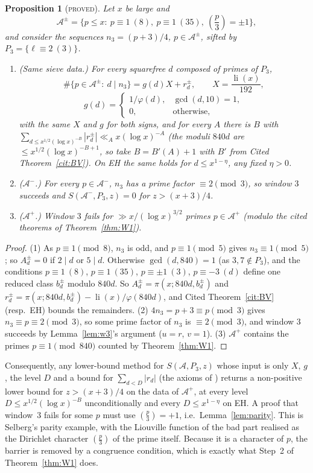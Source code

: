 \documentclass[11pt,reqno]{amsart}
\newtheorem{proposition}[theorem]{Proposition}
\theoremstyle{definition}
\newcommand{\li}{\operatorname{li}}
\newcommand{\leg}[2]{\left(\frac{#1}{#2}\right)}
\newcommand{\status}[1]{\textup{\textsc{#1}}}
\begin{document}
\begin{proposition}[\status{proved}]\label{thm:P1}
Let $x$ be large and
\[
 \mathcal A^\pm=\{p\le x:\ p\equiv1\ (8),\ p\equiv1\ (35),\ \leg p3=\pm1\},
\]
and consider the sequences $n_3=(p+3)/4$, $p\in\mathcal A^\pm$, sifted by
$P_3=\{\ell\equiv2\ (3)\}$.
\begin{enumerate}
\item (Same sieve data.)  For every squarefree $d$ composed of primes of
 $P_3$,
 \[
 \#\{p\in\mathcal A^\pm:\ d\mid n_3\}=g(d)X+r_d^\pm,\qquad X=\frac{\li(x)}{192},
 \]
 \[
 g(d)=\begin{cases}1/\varphi(d),&\gcd(d,10)=1,\\0,&\text{otherwise},\end{cases}
 \]
 with the same $X$ and $g$ for both signs, and for every $A$ there is $B$
 with $\sum_{d\le x^{1/2}(\log x)^{-B}}|r_d^\pm|\ll_A x(\log x)^{-A}$ (the moduli
 $840d$ are $\le x^{1/2}(\log x)^{-B+1}$, so take $B=B'(A)+1$ with $B'$ from
 Cited Theorem~\ref{cit:BV}).  On
 EH the same holds for $d\le x^{1-\eta}$, any fixed $\eta>0$.
\item ($\mathcal A^-$.)  For every $p\in\mathcal A^-$, $n_3$ has a prime factor
 $\equiv2\pmod3$, so window $3$ succeeds and $S(\mathcal A^-,P_3,z)=0$ for
 $z>(x+3)/4$.
\item ($\mathcal A^+$.)  Window $3$ fails for $\gg x/(\log x)^{3/2}$ primes
 $p\in\mathcal A^+$ (modulo the cited theorems of Theorem~\ref{thm:W1}).
\end{enumerate}
\end{proposition}

\begin{proof}
(1) As $p\equiv1\pmod8$, $n_3$ is odd, and $p\equiv1\pmod5$ gives
$n_3\equiv1\pmod5$; so $A_d^\pm=0$ if $2\mid d$ or $5\mid d$.  Otherwise
$\gcd(d,840)=1$ (as $3,7\notin P_3$), and the conditions $p\equiv1\ (8)$,
$p\equiv1\ (35)$, $p\equiv\pm1\ (3)$, $p\equiv-3\ (d)$ define one reduced
class $b^\pm_d$ modulo $840d$.  So $A_d^\pm=\pi(x;840d,b_d^\pm)$ and
$r_d^\pm=\pi(x;840d,b^\pm_d)-\li(x)/\varphi(840d)$, and Cited
Theorem~\ref{cit:BV} (resp.\ EH) bounds the remainders.
(2) $4n_3=p+3\equiv p\pmod3$ gives $n_3\equiv p\equiv2\pmod3$, so some prime
factor of $n_3$ is $\equiv2\pmod3$, and window $3$ succeeds by
Lemma~\ref{lem:w3}'s argument ($u=r$, $v=1$).
(3) $\mathcal A^+$ contains the primes $p\equiv1\pmod{840}$ counted by
Theorem~\ref{thm:W1}.
\end{proof}

Consequently, any lower-bound method for $S(\mathcal A,P_3,z)$ whose input
is only $X$, $g$, the level $D$ and a bound for $\sum_{d<D}|r_d|$ (the
axioms of \cite[Ch.~11]{OdC}) returns a non-positive lower bound for
$z>(x+3)/4$ on the data of $\mathcal A^+$, at every level $D\le x^{1/2}(\log x)^{-B}$
unconditionally and every $D\le x^{1-\eta}$ on EH.  A proof that window~$3$
fails for some $p$ must use $\leg p3=+1$, i.e.\ Lemma~\ref{lem:parity}.
This is Selberg's parity example, with the Liouville function of the bad
part realised as the Dirichlet character $\leg p3$ of the prime itself.
Because it is a character of $p$, the barrier is removed by a congruence
condition, which is exactly what Step~2 of Theorem~\ref{thm:W1} does.
\end{document}
